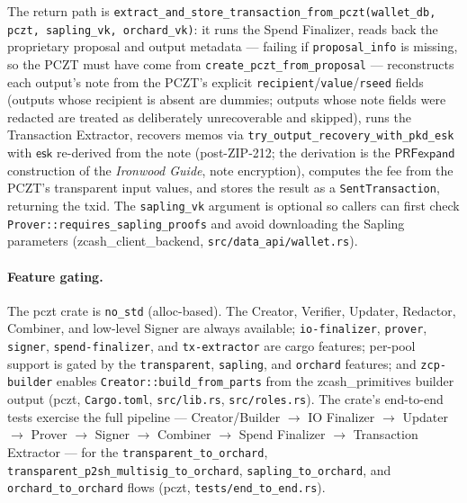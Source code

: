\documentclass[11pt,a4paper]{article}
\theoremstyle{definition}
\begin{document}
The return path is
\texttt{extract\_and\_store\_transaction\_from\_pczt(wallet\_db, pczt,
sapling\_vk, orchard\_vk)}: it runs the Spend Finalizer, reads back the
proprietary proposal and output metadata --- failing if
\texttt{proposal\_info} is missing, so the PCZT must have come from
\texttt{create\_pczt\_from\_proposal} --- reconstructs each output's note
from the PCZT's explicit \texttt{recipient}/\texttt{value}/\texttt{rseed}
fields (outputs whose recipient is absent are dummies; outputs whose note
fields were redacted are treated as deliberately unrecoverable and
skipped), runs the Transaction Extractor, recovers memos via
\texttt{try\_output\_recovery\_with\_pkd\_esk} with $\mathsf{esk}$
re-derived from the note (post-ZIP-212; the derivation is the
$\mathsf{PRFexpand}$ construction of the \emph{Ironwood Guide}, note
encryption), computes the fee from the PCZT's transparent input values,
and stores the result as a \texttt{SentTransaction}, returning the txid.
The \texttt{sapling\_vk} argument is optional so callers can first check
\texttt{Prover::requires\_sapling\_proofs} and avoid downloading the
Sapling parameters (\textsf{zcash\_client\_backend},
\texttt{src/data\_api/wallet.rs}).

\paragraph{Feature gating.} The \textsf{pczt} crate is
\texttt{no\_std} (alloc-based). The Creator, Verifier, Updater, Redactor,
Combiner, and low-level Signer are always available; \texttt{io-finalizer},
\texttt{prover}, \texttt{signer}, \texttt{spend-finalizer}, and
\texttt{tx-extractor} are cargo features; per-pool support is gated by
the \texttt{transparent}, \texttt{sapling}, and \texttt{orchard}
features; and \texttt{zcp-builder} enables
\texttt{Creator::build\_from\_parts} from the \textsf{zcash\_primitives}
builder output (\textsf{pczt}, \texttt{Cargo.toml},
\texttt{src/lib.rs}, \texttt{src/roles.rs}). The crate's end-to-end tests
exercise the full pipeline --- Creator/Builder $\to$ IO Finalizer $\to$
Updater $\to$ Prover $\to$ Signer $\to$ Combiner $\to$ Spend Finalizer
$\to$ Transaction Extractor --- for the \texttt{transparent\_to\_orchard},
\texttt{transparent\_p2sh\_multisig\_to\_orchard},
\texttt{sapling\_to\_orchard}, and \texttt{orchard\_to\_orchard} flows
(\textsf{pczt}, \texttt{tests/end\_to\_end.rs}).
\end{document}
